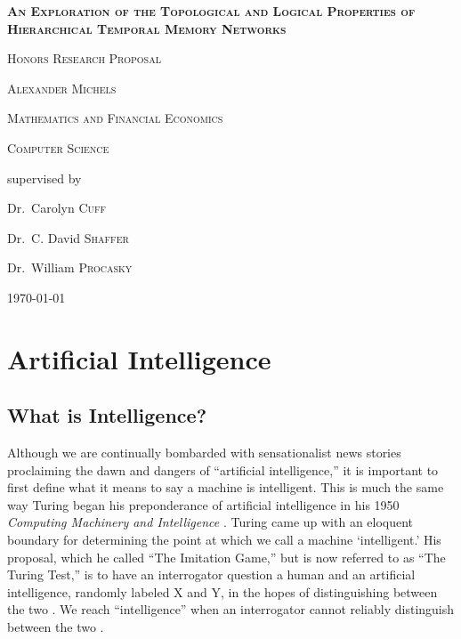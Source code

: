 \documentclass[oneside,12pt,openany]{book}
\begin{document}
	\begin{titlepage}
		\centering
		{\scshape\LARGE \textbf{An Exploration of the Topological and Logical Properties of Hierarchical Temporal Memory Networks} \par}
		{\scshape\LARGE Honors Research Proposal \par}
		\vspace{1cm}
		{\scshape\Large Alexander Michels\par}
		\vspace{0.5cm}
		{\scshape\Large Mathematics and Financial Economics\par}
		\vspace{0.5cm}
		{\scshape\Large Computer Science\par}
		\vspace{1cm}
		\vfill \large
		supervised by\par
		Dr.~Carolyn \textsc{Cuff}\par
		Dr.~C. David \textsc{Shaffer}\par
		Dr.~William \textsc{Procasky}\par
		
		\vfill
		
		{\large \today\par}
	\end{titlepage}
	
	\tableofcontents
	
	\newpage
	
	\chapter{Artificial Intelligence}
	
	\section{What is Intelligence?}
	
	Although we are continually bombarded with sensationalist news stories proclaiming the dawn and dangers of ``artificial intelligence,'' it is important to first define what it means to say a machine is intelligent. This is much the same way Turing began his preponderance of artificial intelligence in his 1950 \textit{Computing Machinery and Intelligence} \cite{Turing}. Turing came up with an eloquent boundary for determining the point at which we call a machine `intelligent.' His proposal, which he called ``The Imitation Game,'' but is now referred to as ``The Turing Test,'' is to have an interrogator question a human and an artificial intelligence, randomly labeled X and Y, in the hopes of distinguishing between the two \cite{Turing}. We reach ``intelligence'' when an interrogator cannot reliably distinguish between the two \cite{Turing}.
	
\end{document}
